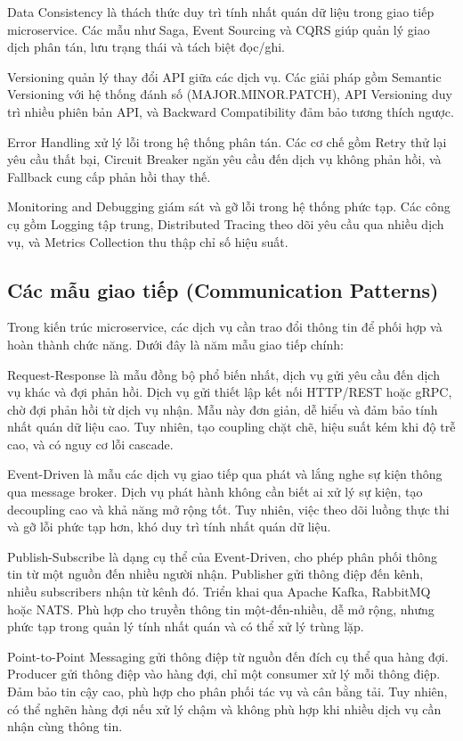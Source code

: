 Data Consistency là thách thức duy trì tính nhất quán dữ liệu trong giao tiếp microservice. Các mẫu như Saga, Event Sourcing và CQRS \cite{richardson2019} giúp quản lý giao dịch phân tán, lưu trạng thái và tách biệt đọc/ghi.

Versioning quản lý thay đổi API giữa các dịch vụ. Các giải pháp gồm Semantic Versioning với hệ thống đánh số (MAJOR.MINOR.PATCH), API Versioning duy trì nhiều phiên bản API, và Backward Compatibility đảm bảo tương thích ngược.

Error Handling xử lý lỗi trong hệ thống phân tán. Các cơ chế gồm Retry thử lại yêu cầu thất bại, Circuit Breaker ngăn yêu cầu đến dịch vụ không phản hồi, và Fallback cung cấp phản hồi thay thế.

Monitoring and Debugging giám sát và gỡ lỗi trong hệ thống phức tạp. Các công cụ gồm Logging tập trung, Distributed Tracing theo dõi yêu cầu qua nhiều dịch vụ, và Metrics Collection thu thập chỉ số hiệu suất.

\subsection{Các mẫu giao tiếp (Communication Patterns)}
Trong kiến trúc microservice, các dịch vụ cần trao đổi thông tin để phối hợp và hoàn thành chức năng. Dưới đây là năm mẫu giao tiếp chính:

Request-Response là mẫu đồng bộ phổ biến nhất, dịch vụ gửi yêu cầu đến dịch vụ khác và đợi phản hồi. Dịch vụ gửi thiết lập kết nối HTTP/REST hoặc gRPC, chờ đợi phản hồi từ dịch vụ nhận. Mẫu này đơn giản, dễ hiểu và đảm bảo tính nhất quán dữ liệu cao. Tuy nhiên, tạo coupling chặt chẽ, hiệu suất kém khi độ trễ cao, và có nguy cơ lỗi cascade.

Event-Driven là mẫu các dịch vụ giao tiếp qua phát và lắng nghe sự kiện thông qua message broker. Dịch vụ phát hành không cần biết ai xử lý sự kiện, tạo decoupling cao và khả năng mở rộng tốt. Tuy nhiên, việc theo dõi luồng thực thi và gỡ lỗi phức tạp hơn, khó duy trì tính nhất quán dữ liệu.

Publish-Subscribe là dạng cụ thể của Event-Driven, cho phép phân phối thông tin từ một nguồn đến nhiều người nhận. Publisher gửi thông điệp đến kênh, nhiều subscribers nhận từ kênh đó. Triển khai qua Apache Kafka, RabbitMQ hoặc NATS. Phù hợp cho truyền thông tin một-đến-nhiều, dễ mở rộng, nhưng phức tạp trong quản lý tính nhất quán và có thể xử lý trùng lặp.

Point-to-Point Messaging gửi thông điệp từ nguồn đến đích cụ thể qua hàng đợi. Producer gửi thông điệp vào hàng đợi, chỉ một consumer xử lý mỗi thông điệp. Đảm bảo tin cậy cao, phù hợp cho phân phối tác vụ và cân bằng tải. Tuy nhiên, có thể nghẽn hàng đợi nếu xử lý chậm và không phù hợp khi nhiều dịch vụ cần nhận cùng thông tin.

